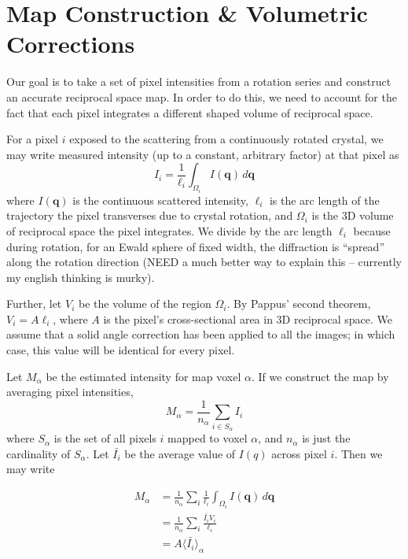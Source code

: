 \documentclass{article}
\begin{document}
%
%
\section{Map Construction \& Volumetric Corrections}

Our goal is to take a set of pixel intensities from a rotation series and construct an accurate reciprocal space map.  In order to do this, we need to account for the fact that each pixel integrates a different shaped volume of reciprocal space.

For a pixel $i$ exposed to the scattering from a continuously rotated crystal, we may write measured intensity (up to a constant, arbitrary factor) at that pixel as 
\begin{equation} 
I_i = \frac{1}{\ell_i} \int_{\Omega_i} I(\mathbf{q}) \, d\mathbf{q}
\label{eq:pixel_intensity}
\end{equation}
where $I(\mathbf{q})$ is the continuous scattered intensity, $\ell_i$ is the arc length of the trajectory the pixel transverses due to crystal rotation, and $\Omega_i$ is the 3D volume of reciprocal space the pixel integrates. We divide by the arc length $\ell_i$ because during rotation, for an Ewald sphere of fixed width, the diffraction is ``spread'' along the rotation direction (NEED a much better way to explain this -- currently my english thinking is murky).

Further, let $V_i$ be the volume of the region $\Omega_i$. By Pappus' second theorem, $V_i = A \ell_i$, where $A$ is the pixel's cross-sectional area in 3D reciprocal space. We assume that a solid angle correction has been applied to all the images; in which case, this value will be identical for every pixel.

Let $M_\alpha$ be the estimated intensity for map voxel $\alpha$. If we construct the map by averaging pixel intensities,
\[
M_\alpha = \frac{1}{n_\alpha} \sum_{i \in S_\alpha} I_i
\]
where $S_\alpha$ is the set of all pixels $i$ mapped to voxel $\alpha$, and $n_\alpha$ is just the cardinality of $S_\alpha$. Let $\bar{I_i}$ be the average value of $I(q)$ across pixel $i$. Then we may write

\begin{align*}
M_\alpha &= \frac{1}{n_\alpha} \sum_i  \frac{1}{\ell_i} \int_{\Omega_i} I(\mathbf{q}) \, d\mathbf{q} \\
&= \frac{1}{n_\alpha} \sum_i \frac{ \bar{I_i} V_i }{ \ell_i } \\
&= A \langle \bar{I_i} \rangle_\alpha
\end{align*}
\end{document}
